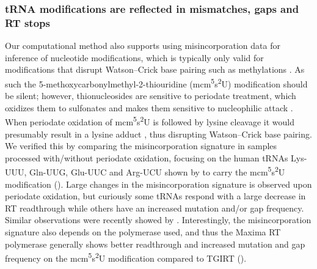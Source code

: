 \documentclass[9pt,lineno]{elife}
\begin{document}
\subsubsection{tRNA modifications are reflected in mismatches, gaps and RT stops}
Our computational method also supports using misincorporation data for inference of nucleotide modifications, which is typically only valid for modifications that disrupt Watson–Crick base pairing such as methylations \citep{Clark2016-ph, Behrens2021-gb}.
As such the 5-methoxycarbonylmethyl-2-thiouridine (mcm\textsuperscript{5}s\textsuperscript{2}U) modification should be silent; however, thionucleosides are sensitive to periodate treatment, which oxidizes them to sulfonates and makes them sensitive to nucleophilic attack \citep{Ziff1968-la, Rao1974-zq}.
When periodate oxidation of mcm\textsuperscript{5}s\textsuperscript{2}U is followed by lysine cleavage it would presumably result in a lysine adduct \citep{Ziff1968-la}, thus disrupting Watson–Crick base pairing.
We verified this by comparing the misincorporation signature in samples processed with/without periodate oxidation, focusing on the human tRNAs Lys-UUU, Gln-UUG, Glu-UUC and Arg-UCU shown by \cite{Lentini2018-xs} to carry the mcm\textsuperscript{5}s\textsuperscript{2}U modification ().
Large changes in the misincorporation signature is observed upon periodate oxidation, but curiously some tRNAs respond with a large decrease in RT readthrough while others have an increased mutation and/or gap frequency.
Similar observations were recently showed by \cite{Katanski2022-ij}.
Interestingly, the misincorporation signature also depends on the polymerase used, and thus the Maxima RT polymerase generally shows better readthrough and increased mutation and gap frequency on the mcm\textsuperscript{5}s\textsuperscript{2}U modification compared to TGIRT ().
\end{document}
